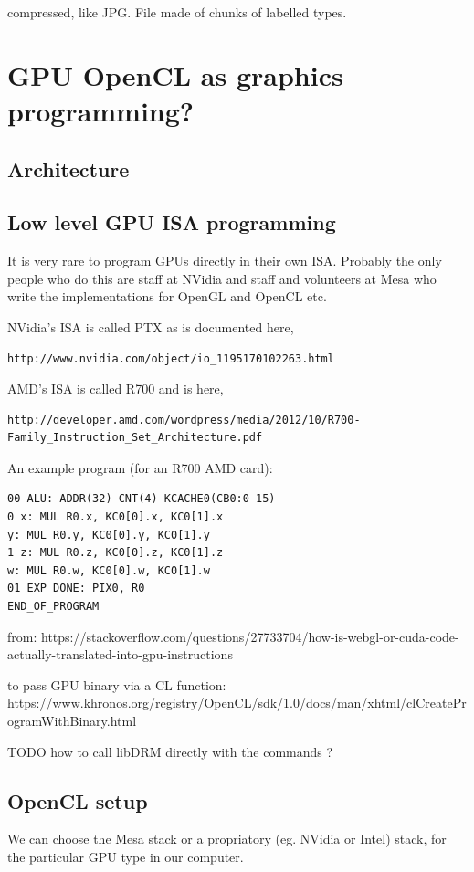 \documentclass[oneside,english]{scrbook}
\begin{document}
compressed, like JPG. File made of chunks of labelled types.



\chapter{GPU OpenCL as graphics programming?}

\section{Architecture}

\section{Low level GPU ISA programming}

It is very rare to program GPUs directly in their own ISA.  Probably the only people who do this are staff at NVidia and staff and volunteers at Mesa who write the implementations for OpenGL and OpenCL etc.

NVidia's ISA is called PTX as is documented here,
\begin{lstlisting}
http://www.nvidia.com/object/io_1195170102263.html
\end{lstlisting}

AMD's ISA is called R700 and is here,
\begin{lstlisting}
http://developer.amd.com/wordpress/media/2012/10/R700-Family_Instruction_Set_Architecture.pdf
\end{lstlisting}

An example program (for an R700 AMD card):

\begin{lstlisting}
00 ALU: ADDR(32) CNT(4) KCACHE0(CB0:0-15)   
0 x: MUL R0.x, KC0[0].x, KC0[1].x    
y: MUL R0.y, KC0[0].y, KC0[1].y
1 z: MUL R0.z, KC0[0].z, KC0[1].z
w: MUL R0.w, KC0[0].w, KC0[1].w
01 EXP_DONE: PIX0, R0
END_OF_PROGRAM
\end{lstlisting}

from:
https://stackoverflow.com/questions/27733704/how-is-webgl-or-cuda-code-actually-translated-into-gpu-instructions

to pass GPU binary via a CL function:
https://www.khronos.org/registry/OpenCL/sdk/1.0/docs/man/xhtml/clCreateProgramWithBinary.html


TODO how to call libDRM directly with the commands ?
\section{OpenCL setup}
We can choose the Mesa stack or a propriatory (eg. NVidia or Intel) stack, for the particular GPU type in our computer.
\end{document}
